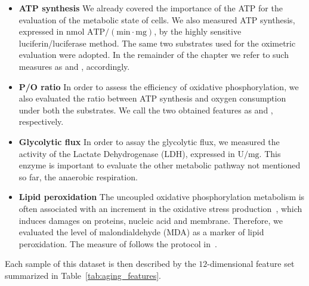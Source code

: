 \begin{itemize}
	\item[] \textbf{ATP synthesis} We already covered the importance of the ATP for the evaluation of the metabolic state of cells. We also measured ATP synthesis, expressed in $\text{nmol~ATP}/(\text{min}\cdot\text{mg})$,  by the highly sensitive luciferin/luciferase method. The same two substrates used for the oximetric evaluation were adopted. In the remainder of the chapter we refer to such measures as \atppyrmal and \atpsucc, accordingly.
	
	\item[] \textbf{P/O ratio} In order to assess the efficiency of oxidative phosphorylation, we also evaluated the ratio between ATP synthesis and oxygen consumption under both the substrates. We call the two obtained features as \popyrmal and \posucc, respectively.
	
	\item[] \textbf{Glycolytic flux} In order to assay the glycolytic flux, we measured the activity of the Lactate Dehydrogenase (\ac{LDH}), expressed in $\text{U}/\text{mg}$. This enzyme is important to evaluate the other metabolic pathway not mentioned so far, \ie the anaerobic respiration.
	
	\item[] \textbf{Lipid peroxidation} The uncoupled oxidative phosphorylation metabolism is often associated with an increment in the oxidative stress production~\cite{dai2014mitochondrial}, which induces damages on proteins, nucleic acid and membrane. Therefore, we evaluated the level of malondialdehyde (\ac{MDA}) as a marker of lipid peroxidation. The measure of \mda follows the protocol in~\cite{ravera2015oxidative}.	
\end{itemize}

Each sample of this dataset is then described by the $12$-dimensional feature set summarized in Table~\ref{tab:aging_features}.

